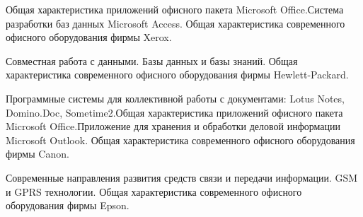 \documentclass[
	14pt,
	a4paper,
	]
	{scrartcl}
\begin{document}
\vfill
\z Общая характеристика приложений офисного пакета Microsoft Office.Система разработки баз данных Microsoft Access.
 \vfill
\z Общая характеристика современного офисного оборудования фирмы Xerox.
 \vfill

\vfill

\newpage


\shapk
{}
\setcounter{zad}{0}

\vfill
\z Совместная работа с данными. Базы данных и базы знаний.
 \vfill
\z Общая характеристика современного офисного оборудования фирмы Hewlett-Packard.
 \vfill

\vfill

\newpage


\shapk
{}
\setcounter{zad}{0}

\vfill
\z Программные системы для коллективной работы с документами: Lotus Notes, Domino.Doc, Sometime2.Общая характеристика приложений офисного пакета Microsoft Office.Приложение для хранения и обработки деловой информации Microsoft Outlook.
 \vfill
\z Общая характеристика современного офисного оборудования фирмы Canon.
 \vfill

\vfill

\newpage


\shapk
{}
\setcounter{zad}{0}

\vfill
\z Современные направления развития средств связи и передачи информации. GSM и GPRS технологии.
 \vfill
\z Общая характеристика современного офисного оборудования фирмы Epson.
 \vfill

\vfill

\newpage
\end{document}
